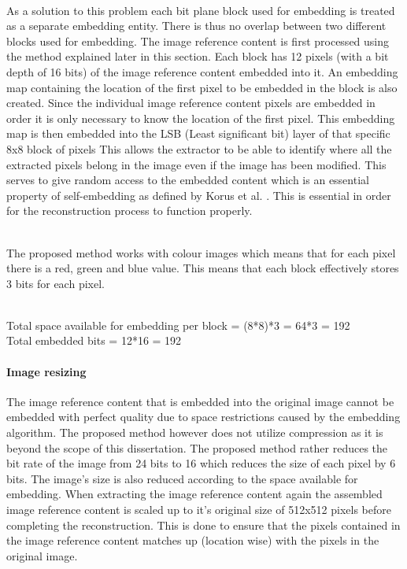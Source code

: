 \documentclass[12pt]{article}
\begin{document}
\hspace{0pt} \\
As a solution to this problem each bit plane block used for embedding is treated as a separate embedding entity.
There is thus no overlap between two different blocks used for embedding.
The image reference content is first processed using the method explained later in this section.
Each block has 12 pixels (with a bit depth of 16 bits) of the image reference content embedded into it.
An embedding map containing the location of the first pixel to be embedded in the block is also created.
Since the individual image reference content pixels are embedded in order it is only necessary to know the location of the first pixel.
This embedding map is then embedded into the LSB (Least significant bit) layer of that specific 8x8 block of pixels 
This allows the extractor to be able to identify where all the extracted pixels belong in the image even if the image has been modified.
This serves to give random access to the embedded content which is an essential property of self-embedding as defined by Korus et al. \cite{korus2013efficient}.
This is essential in order for the reconstruction process to function properly.

\hspace{0pt} \\
The proposed method works with colour images which means that for each pixel there is a red, green and blue value. This means that each block effectively stores 3 bits for each pixel.

\hspace{0pt} \\
Total space available for embedding per block = (8*8)*3 = 64*3 = 192
\hspace{0pt} \\
Total embedded bits = 12*16 = 192

\paragraph{Image resizing}
\label{ImageCompression}
The image reference content that is embedded into the original image cannot be embedded with perfect quality due to space restrictions caused by the embedding algorithm. 
The proposed method however does not utilize compression as it is beyond the scope of this dissertation.
The proposed method rather reduces the bit rate of the image from 24 bits to 16 which reduces the size of each pixel by 6 bits.
The image's size is also reduced according to the space available for embedding.
When extracting the image reference content again the assembled image reference content is scaled up to it's original size of 512x512 pixels before completing the reconstruction.
This is done to ensure that the pixels contained in the image reference content matches up (location wise) with the pixels in the original image.
\end{document}
